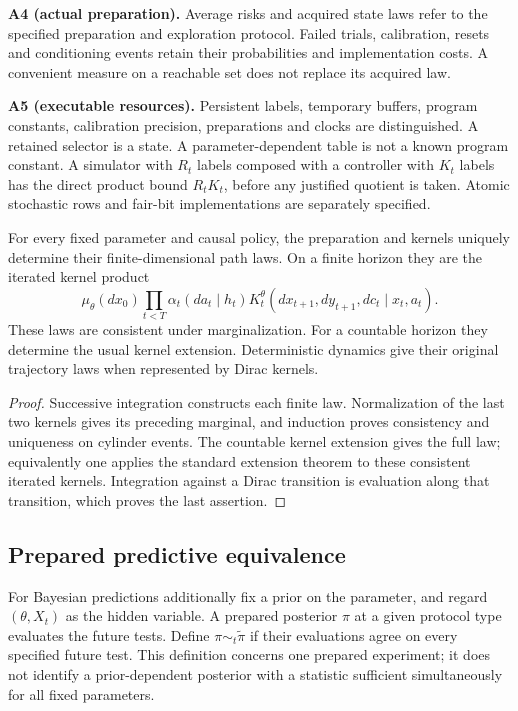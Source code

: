 \smallskip\noindent\textbf{A4 (actual preparation).}
Average risks and acquired state laws refer to the specified preparation
and exploration protocol. Failed trials, calibration, resets and
conditioning events retain their probabilities and implementation costs.
A convenient measure on a reachable set does not replace its acquired
law.

\smallskip\noindent\textbf{A5 (executable resources).}
Persistent labels, temporary buffers, program constants, calibration
precision, preparations and clocks are distinguished. A retained
selector is a state. A parameter-dependent table is not a known program
constant. A simulator with $R_t$ labels composed with a controller with
$K_t$ labels has the direct product bound $R_tK_t$, before any justified
quotient is taken. Atomic stochastic rows and fair-bit implementations
are separately specified.

\begin{proposition}\label{prop:path-law}
For every fixed parameter and causal policy, the preparation and kernels
uniquely determine their finite-dimensional path laws. On a finite
horizon they are the iterated kernel product
\[
 \mu_\theta(dx_0)\prod_{t<T}
   \alpha_t(da_t\mid h_t)K_t^\theta(dx_{t+1},dy_{t+1},dc_t\mid x_t,a_t).
\]
These laws are consistent under marginalization. For a countable horizon
they determine the usual kernel extension. Deterministic dynamics give
their original trajectory laws when represented by Dirac kernels.
\end{proposition}
\begin{proof}
Successive integration constructs each finite law. Normalization of the
last two kernels gives its preceding marginal, and induction proves
consistency and uniqueness on cylinder events. The countable kernel
extension gives the full law; equivalently one applies the standard
extension theorem to these consistent iterated kernels. Integration
against a Dirac transition is evaluation along that transition, which
proves the last assertion.
\end{proof}

\subsection{Prepared predictive equivalence}
For Bayesian predictions additionally fix a prior on the parameter, and
regard $(\theta,X_t)$ as the hidden variable. A prepared posterior $\pi$
at a given protocol type evaluates the future tests. Define
$\pi\sim_t\widetilde\pi$ if their evaluations agree on every specified
future test. This definition concerns one prepared experiment; it does
not identify a prior-dependent posterior with a statistic sufficient
simultaneously for all fixed parameters.

